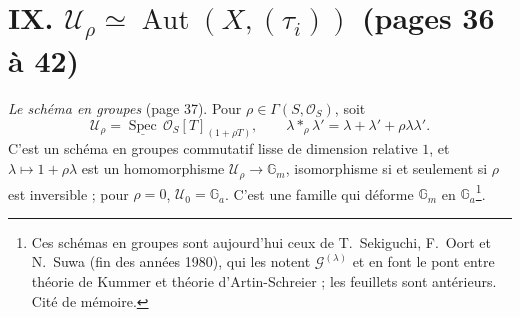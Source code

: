 \documentclass[11pt,a4paper]{article}
\begin{document}
\section*{IX. $\mathcal{U}_\rho \simeq \operatorname{Aut}(X, (\tau_i))$ (pages 36 à 42)}

\emph{Le schéma en groupes} (page 37). Pour $\rho \in \Gamma(S, \mathcal{O}_S)$,
soit
\[
\mathcal{U}_\rho = \underline{\operatorname{Spec}}\, \mathcal{O}_S[T]_{(1 +
\rho T)}, \qquad \lambda *_\rho \lambda' = \lambda + \lambda' + \rho\lambda\lambda'
.
\]
C'est un schéma en groupes commutatif lisse de dimension relative $1$, et
$\lambda \mapsto 1 + \rho\lambda$ est un homomorphisme $\mathcal{U}_\rho \to
\mathbb{G}_m$, isomorphisme si et seulement si $\rho$ est inversible ; pour
$\rho = 0$, $\mathcal{U}_0 = \mathbb{G}_a$. C'est une famille qui déforme
$\mathbb{G}_m$ en $\mathbb{G}_a$\footnote{Ces schémas en groupes sont aujourd'hui
ceux de T.~Sekiguchi, F.~Oort et N.~Suwa (fin des années 1980), qui les
notent $\mathcal{G}^{(\lambda)}$ et en font le pont entre théorie de Kummer et
théorie d'Artin-Schreier ; les feuillets sont antérieurs. Cité de mémoire.}.
\end{document}
